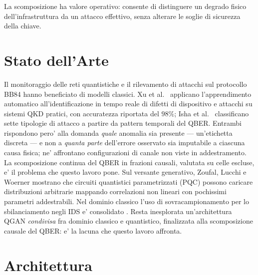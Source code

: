 \documentclass[10pt,conference,a4paper,twocolumn]{IEEEtran}
\begin{document}
La scomposizione ha valore operativo: consente di distinguere un degrado fisico dell'infrastruttura da un attacco effettivo, senza alterare le soglie di sicurezza della chiave.

\section{Stato dell'Arte}

Il monitoraggio delle reti quantistiche e il rilevamento di attacchi sul protocollo BB84 \cite{bb84} hanno beneficiato di modelli classici. Xu et al.\ \cite{qkd_attack_ml} applicano l'apprendimento automatico all'identificazione in tempo reale di difetti di dispositivo e attacchi su sistemi QKD pratici, con accuratezza riportata del $98\%$; Isha et al.\ \cite{attacco_binario} classificano sette tipologie di attacco a partire da pattern temporali del QBER. Entrambi rispondono pero' alla domanda \emph{quale} anomalia sia presente — un'etichetta discreta — e non a \emph{quanta parte} dell'errore osservato sia imputabile a ciascuna causa fisica; ne' affrontano configurazioni di canale non viste in addestramento. La scomposizione continua del QBER in frazioni causali, valutata su celle escluse, e' il problema che questo lavoro pone. Sul versante generativo, Zoufal, Lucchi e Woerner \cite{qgan_nisq} mostrano che circuiti quantistici parametrizzati (PQC) possono caricare distribuzioni arbitrarie mappando correlazioni non lineari con pochissimi parametri addestrabili. Nel dominio classico l'uso di sovracampionamento per lo sbilanciamento negli IDS e' consolidato \cite{ids_survey}. Resta inesplorata un'architettura QGAN \emph{condivisa} fra dominio classico e quantistico, finalizzata alla scomposizione causale del QBER: e' la lacuna che questo lavoro affronta.

\section{Architettura}
\end{document}
